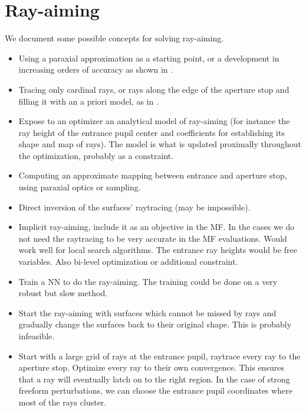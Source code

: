 \section{Ray-aiming}
We document some possible concepts for solving ray-aiming.

\begin{itemize}
\item Using a paraxial approximation as a starting point, or a development
      in increasing orders of accuracy as shown in \cite{Zheng2010}.
\item Tracing only cardinal rays, or rays along the edge of the aperture
      stop and filling it with an a priori model, as in \cite{Houllier-thesis}.
\item Expose to an optimizer an analytical model of ray-aiming (for instance
      the ray height of the entrance pupil center and coefficients for
      establishing its shape and map of rays). The model is what is updated
      proximally throughout the optimization, probably as a constraint.
\item Computing an approximate mapping between entrance and aperture stop,
      using paraxial optics or sampling.
\item Direct inversion of the surfaces' raytracing (may be impossible).
\item Implicit ray-aiming, include it as an objective in the MF. In the
      cases we do not need the raytracing to be very accurate in the MF
      evaluations. Would work well for local search algorithms. The
      entrance ray heights would be free variables. Also bi-level
      optimization or additional constraint.
\item Train a NN to do the ray-aiming. The training could be done on
      a very robust but slow method.
\item Start the ray-aiming with surfaces which cannot be missed by rays
      and gradually change the surfaces back to their original shape.
      This is probably infeasible.
\item Start with a large grid of rays at the entrance pupil, raytrace every ray
      to the aperture stop. Optimize every ray to their own convergence.
      This ensures that a ray will eventually latch on to the right region.
      In the case of strong freeform perturbations, we can choose the entrance
      pupil coordinates where most of the rays cluster.
\end{itemize}
